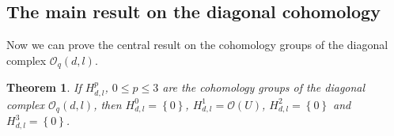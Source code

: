 \documentclass[12pt,reqno]{amsart}%
\newtheorem{theorem}{Theorem}
\theoremstyle{plain}
\numberwithin{theorem}{section} \numberwithin{equation}{section}
\numberwithin{lemma}{section}
\numberwithin{remark}{section}
\numberwithin{example}{section}
\numberwithin{proposition}{section}
\numberwithin{definition}{section}
\numberwithin{corollary}{section}
\begin{document}
\subsection{The main result on the diagonal cohomology}

Now we can prove the central result on the cohomology groups of the diagonal
complex $\mathcal{O}_{q}\left(  d,l\right)  $.

\begin{theorem}
\label{thMain1}If $H_{d,l}^{p}$, $0\leq p\leq3$ are the cohomology groups of
the diagonal complex $\mathcal{O}_{q}\left(  d,l\right)  $, then $H_{d,l}%
^{0}=\left\{  0\right\}  $, $H_{d,l}^{1}=\mathcal{O}\left(  U\right)  $,
$H_{d,l}^{2}=\left\{  0\right\}  $ and $H_{d,l}^{3}=\left\{  0\right\}  $.
\end{theorem}
\end{document}
